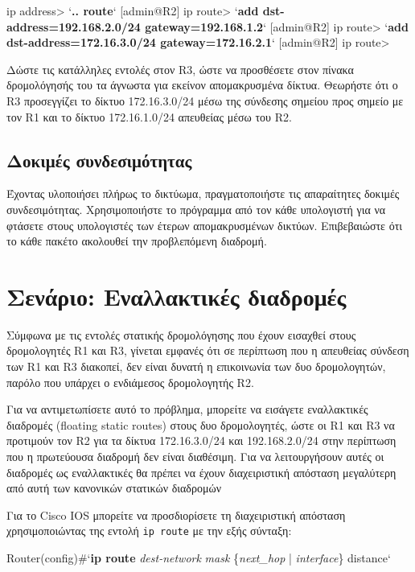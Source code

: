 \documentclass{EdipyLabs} %
\begin{document}
\begin{CommandBox}
[admin@R2] ip address> `\textbf{.. route}`
[admin@R2] ip route> `\textbf{add dst-address=192.168.2.0/24 gateway=192.168.1.2}`
[admin@R2] ip route> `\textbf{add dst-address=172.16.3.0/24 gateway=172.16.2.1}`
[admin@R2] ip route> 
\end{CommandBox}

Δώστε τις κατάλληλες εντολές στον R3, ώστε να προσθέσετε στον πίνακα δρομολόγησής του τα άγνωστα για εκείνον απομακρυσμένα δίκτυα. Θεωρήστε ότι ο R3 προσεγγίζει το δίκτυο 172.16.3.0/24 μέσω της σύνδεσης σημείου προς σημείο με τον R1 και το δίκτυο 172.16.1.0/24 απευθείας μέσω του R2.

\subsection*{Δοκιμές συνδεσιμότητας}
Έχοντας υλοποιήσει πλήρως το δικτύωμα, πραγματοποιήστε τις απαραίτητες δοκιμές συνδεσιμότητας. Χρησιμοποιήστε το πρόγραμμα  από τον κάθε υπολογιστή για να φτάσετε στους υπολογιστές των έτερων απομακρυσμένων δικτύων. Επιβεβαιώστε ότι το κάθε πακέτο ακολουθεί την προβλεπόμενη διαδρομή.

\section{Σενάριο: Εναλλακτικές διαδρομές}

Σύμφωνα με τις εντολές στατικής δρομολόγησης που έχουν εισαχθεί στους δρομολογητές R1 και R3, γίνεται εμφανές ότι σε περίπτωση που η απευθείας σύνδεση των R1 και R3 διακοπεί, δεν είναι δυνατή η επικοινωνία των δυο δρομολογητών, παρόλο που υπάρχει ο ενδιάμεσος δρομολογητής R2.

Για να αντιμετωπίσετε αυτό το πρόβλημα, μπορείτε να εισάγετε εναλλακτικές διαδρομές (floating static routes) στους δυο δρομολογητές, ώστε οι R1 και R3 να προτιμούν τον R2 για τα δίκτυα 172.16.3.0/24 και 192.168.2.0/24 στην περίπτωση που η πρωτεύουσα διαδρομή δεν είναι διαθέσιμη. Για να λειτουργήσουν αυτές οι διαδρομές ως εναλλακτικές θα πρέπει να έχουν διαχειριστική απόσταση μεγαλύτερη από αυτή των κανονικών στατικών διαδρομών

Για το Cisco IOS μπορείτε να προσδιορίσετε τη διαχειριστική απόσταση χρησιμοποιώντας της εντολή \texttt{ip route} με την εξής σύνταξη:

\begin{CommandBox}
Router(config)#`\textbf{ip route} \textit{dest-network} \textit{mask} \{\textit{next\_hop} | \textit{interface}\} distance`
\end{CommandBox}
\end{document}
